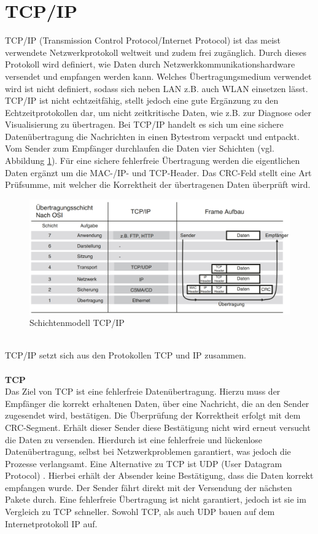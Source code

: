 \documentclass[ a4paper,
                oneside,
                toc=bibliography,
                toc=listof
                ]{scrbook}
\begin{document}
	\section{TCP/IP}
	TCP/IP (Transmission Control Protocol/Internet Protocol) ist das meist verwendete Netzwerkprotokoll weltweit und zudem frei zugänglich. Durch dieses Protokoll wird definiert, wie Daten durch Netzwerkkommunikationshardware versendet und empfangen werden kann. Welches Übertragungsmedium verwendet wird ist  nicht definiert, sodass sich neben LAN z.B. auch WLAN einsetzen lässt.\cite{CS9_TCP} \cite{kim2016service} \\
	TCP/IP ist nicht echtzeitfähig, stellt jedoch eine gute Ergänzung zu den Echtzeitprotokollen dar, um nicht zeitkritische Daten, wie z.B. zur Diagnose oder  Visualisierung zu übertragen. Bei TCP/IP handelt es sich um eine sichere Datenübertragung die Nachrichten in einen Bytestrom verpackt und entpackt. Vom Sender zum Empfänger durchlaufen die Daten vier Schichten (vgl. Abbildung \ref{fig:Schichtenmodell}). Für eine sichere fehlerfreie Übertragung werden die eigentlichen Daten ergänzt um die MAC-/IP- und TCP-Header. Das CRC-Feld stellt eine Art Prüfsumme, mit welcher die Korrektheit der übertragenen Daten überprüft wird. \cite{hering2012elektrotechnik}
	\begin{figure}[!ht]
		\centering
		\includegraphics[width=1.0\linewidth]{./images/Schichtenmodell_TCP_IP.png}
		\caption{Schichtenmodell TCP/IP \cite{hering2012elektrotechnik}}
		\label{fig:Schichtenmodell}
	\end{figure} \\
	TCP/IP setzt sich aus den Protokollen TCP und IP zusammen.\\
	\\
	\textbf{TCP}\\
	Das Ziel von TCP ist eine fehlerfreie Datenübertragung. Hierzu muss der Empfänger die korrekt erhaltenen Daten, über eine Nachricht, die an den Sender zugesendet wird, bestätigen. Die Überprüfung der Korrektheit erfolgt mit dem CRC-Segment. Erhält dieser Sender diese Bestätigung nicht wird erneut versucht die Daten zu versenden. Hierdurch ist eine fehlerfreie und lückenlose Datenübertragung, selbst bei Netzwerkproblemen garantiert, was jedoch die Prozesse verlangsamt. Eine Alternative zu TCP ist UDP (User Datagram Protocol) . Hierbei erhält der Absender keine Bestätigung, dass die Daten korrekt empfangen wurde. Der Sender fährt direkt mit der Versendung der nächsten Pakete durch. Eine fehlerfreie Übertragung ist nicht garantiert, jedoch ist sie im Vergleich zu TCP schneller. Sowohl TCP, als auch UDP bauen auf dem Internetprotokoll IP auf. \cite{CS9_TCP}\\
\end{document}
